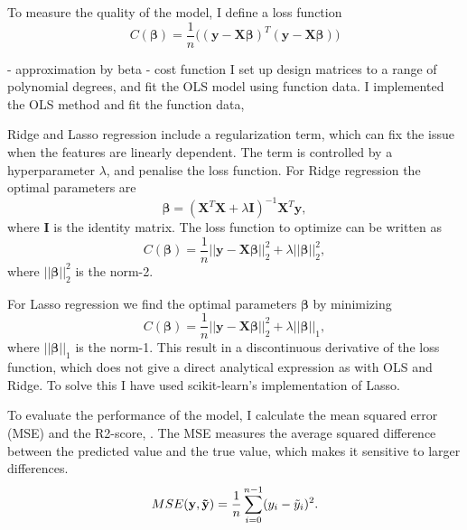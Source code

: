 To measure the quality of the model, I define a loss function 
\begin{equation*}
    C (\mathbf{\beta}) = \frac{1}{n} \big( (\mathbf{y} - \mathbf{X} \mathbf{\beta})^{T} (\mathbf{y} - \mathbf{X} \mathbf{\beta}) \big)
\end{equation*}

- approximation by beta
- cost function
I set up design matrices to a range of polynomial degrees, and fit the OLS model using function data. 
I implemented the OLS method and fit the function data, 


Ridge and Lasso regression include a regularization term, which can fix the issue when the features are linearly dependent. The term is controlled by a hyperparameter $\lambda$, and penalise the loss function. For Ridge regression the optimal parameters are
\begin{equation}\label{eq:ridge_beta}
    \mathbf{\beta} = (\mathbf{X}^{T}\mathbf{X} + \lambda \mathbf{I})^{-1} \mathbf{X}^{T} \mathbf{y},
\end{equation}
where $\mathbf{I}$ is the identity matrix. The loss function to optimize can be written as
\begin{equation}\label{eq:ridge_cost}
    C (\mathbf{\beta}) = \frac{1}{n} || \mathbf{y} - \mathbf{X} \mathbf{\beta} ||_{2}^{2} + \lambda || \mathbf{\beta} ||_{2}^{2} ,
\end{equation}
where $|| \mathbf{\beta} ||_{2}^{2}$ is the norm-2.

For Lasso regression we find the optimal parameters $\mathbf{\beta}$ by minimizing
\begin{equation}\label{eq:lasso_cost}
    C (\mathbf{\beta}) = \frac{1}{n} || \mathbf{y} - \mathbf{X} \mathbf{\beta} ||_{2}^{2} + \lambda || \mathbf{\beta} ||_{1} ,
\end{equation}
where $|| \mathbf{\beta} ||_{1}$ is the norm-1. This result in a discontinuous derivative of the loss function, which does not give a direct analytical expression as with OLS and Ridge. To solve this I have used scikit-learn's implementation of Lasso.


To evaluate the performance of the model, I calculate the mean squared error (MSE) and the R2-score, . The MSE measures the average squared difference between the predicted value and the true value, which makes it sensitive to larger differences. 
\begin{equation}\label{eq:mse}
    MSE(\mathbf{y}, \mathbf{\Tilde{y}}) = \frac{1}{n} \sum_{i=0}^{n-1} (y_{i} - \Tilde{y}_{i})^{2}.
\end{equation}

